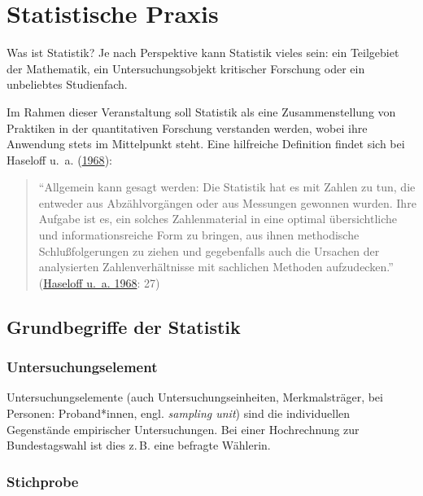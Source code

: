 \documentclass[
  11pt,
  ngerman,
  a4paper,
]{report}
\begin{document}
\hypertarget{statistische-praxis}{%
\section{Statistische Praxis}\label{statistische-praxis}}

Was ist Statistik? Je nach Perspektive kann Statistik vieles sein: ein Teilgebiet der Mathematik, ein Untersuchungsobjekt kritischer Forschung oder ein unbeliebtes Studienfach.

Im Rahmen dieser Veranstaltung soll Statistik als eine Zusammenstellung von Praktiken in der quantitativen Forschung verstanden werden, wobei ihre Anwendung stets im Mittelpunkt steht. Eine hilfreiche Definition findet sich bei Haseloff u.~a. (\protect\hyperlink{ref-haseloff}{1968}):

\begin{quote}
\enquote{Allgemein kann gesagt werden: Die Statistik hat es mit Zahlen zu tun, die entweder aus Abzählvorgängen oder aus Messungen gewonnen wurden. Ihre Aufgabe ist es, ein solches Zahlenmaterial in eine optimal übersichtliche und informationsreiche Form zu bringen, aus ihnen methodische Schlußfolgerungen zu ziehen und gegebenfalls auch die Ursachen der analysierten Zahlenverhältnisse mit sachlichen Methoden aufzudecken.} (\protect\hyperlink{ref-haseloff}{Haseloff u.~a. 1968}: 27)
\end{quote}

\hypertarget{grundbegriffe-der-statistik}{%
\subsection{Grundbegriffe der Statistik}\label{grundbegriffe-der-statistik}}

\nopagebreak

\hypertarget{untersuchungselement}{%
\subsubsection{Untersuchungselement}\label{untersuchungselement}}

Untersuchungselemente (auch Untersuchungseinheiten, Merkmalsträger, bei Personen: Proband*innen, engl. \emph{sampling unit}) sind die individuellen Gegenstände empirischer Untersuchungen. Bei einer Hochrechnung zur Bundestagswahl ist dies z.\,B. eine befragte Wählerin.

\hypertarget{stichprobe}{%
\subsubsection{Stichprobe}\label{stichprobe}}
\end{document}
